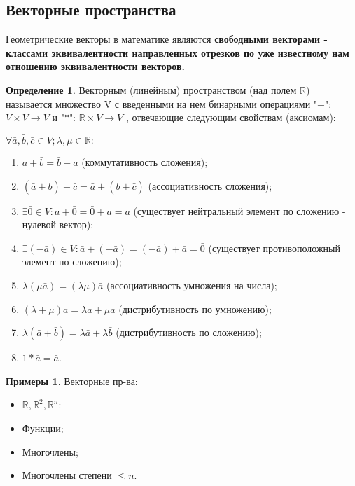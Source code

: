 \documentclass[a4paper, 12pt]{article}
\theoremstyle{definition}
\newtheorem*{definition}{Определение}
\newtheorem*{examples}{Примеры}
\begin{document}
	\subsection{Векторные пространства}
	Геометрические векторы в математике являются \bfseries свободными векторами \mdseries - классами эквивалентности направленных отрезков по уже известному нам отношению эквивалентности векторов.
	\begin{definition}
		Векторным (линейным) пространством (над полем $\mathbb{R}$) называется множество V с введенными на нем бинарными операциями "+": $V \times V \rightarrow V$ и "$*$": $\mathbb{R} \times V \rightarrow V$ , отвечающие следующим свойствам (аксиомам):
		
		$\forall \bar{a}, \bar{b}, \bar{c} \in V; \lambda, \mu \in \mathbb{R}:$
		\begin{enumerate}
			\item $\bar{a} + \bar{b} = \bar{b} + \bar{a}$ (коммутативность сложения);
			\item $(\bar{a} + \bar{b}) + \bar{c} = \bar{a} + (\bar{b} + \bar{c})$ (ассоциативность сложения);
			\item $\exists \bar{0} \in V: \bar{a} + \bar{0} = \bar{0} + \bar{a} = \bar{a}$ (существует нейтральный элемент по сложению - нулевой вектор);
			\item $\exists (-\bar{a}) \in V: \bar{a} + (-\bar{a}) = (-\bar{a}) + \bar{a} = \bar{0}$ (существует противоположный элемент по сложению);
			\item $\lambda(\mu\bar{a}) = (\lambda\mu)\bar{a}$ (ассоциативность умножения на числа);
			\item $(\lambda + \mu)\bar{a} = \lambda\bar{a}+ \mu\bar{a}$ (дистрибутивность по умножению);
			\item $\lambda(\bar{a} + \bar{b}) = \lambda\bar{a}+ \lambda\bar{b}$ (дистрибутивность по сложению);
			\item $1*\bar{a} = \bar{a}$.
		\end{enumerate}
	\end{definition}
	\begin{examples}
		Векторные пр-ва:
		\begin{itemize}
			\item $\mathbb{R}, \mathbb{R}^2, \mathbb{R}^n$:
			\item Функции;
			\item Многочлены;
			\item Многочлены степени $\leqslant n$.
		\end{itemize}
	\end{examples}
\end{document}
